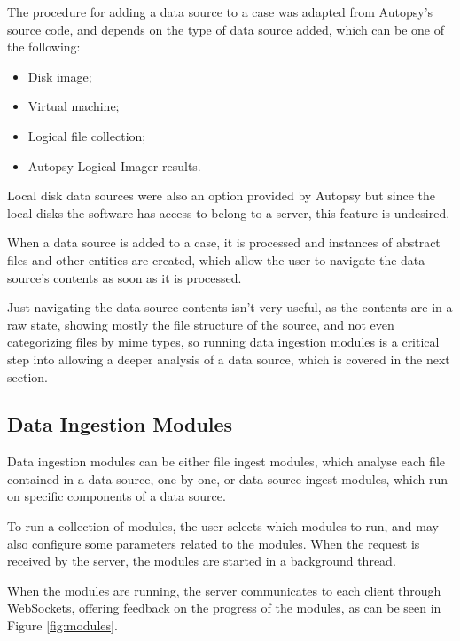 The procedure for adding a data source to a case was adapted from Autopsy's source code, and depends on the type of data source added, which can be one of the following:
\begin{itemize}
 \item Disk image;
 \item Virtual machine;
 \item Logical file collection;
 \item Autopsy Logical Imager \cite{imager} results.
\end{itemize}

Local disk data sources were also an option provided by Autopsy but since the local disks the software has access to belong to a server, this feature is undesired.

When a data source is added to a case, it is processed and instances of abstract files and other entities are created, which allow the user to navigate the data source's contents as soon as it is processed.

Just navigating the data source contents isn't very useful, as the contents are in a raw state, showing mostly the file structure of the source, and not even categorizing files by \acrshort{mime} types, so running data
ingestion modules is a critical step into allowing a deeper analysis of a data source, which is covered in the next section.

\subsection{Data Ingestion Modules}

Data ingestion modules can be either file ingest modules, which analyse each file contained in a data source, one by one,
or data source ingest modules, which run on specific components of a data source.

To run a collection of modules, the user selects which modules to run, and may also configure some parameters related to the modules. When the request is received by the server, the modules are started in a background thread.

When the modules are running, the server communicates to each client through WebSockets, offering feedback on the progress of the modules, as can be seen in Figure \ref{fig:modules}.

